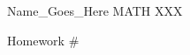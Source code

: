 \documentclass{article}
\newenvironment{problem}[2][Problem]{\begin{trivlist}
\item[\hskip \labelsep {\bfseries #1}\hskip \labelsep {\bfseries #2.}]}{\end{trivlist}}
\begin{document}
\large 
\linespread{1.5}

{\Large Name_Goes_Here %
\hfill  MATH XXX} %
\begin{center}
{\Large Homework #} %
\end{center}
\vspace{0.05in}

\begin{problem}{insert problem number}
\end{problem}

\begin{problem}{insert problem number}
\end{problem}

\begin{problem}{insert problem number}
\end{problem}


\end{document}
